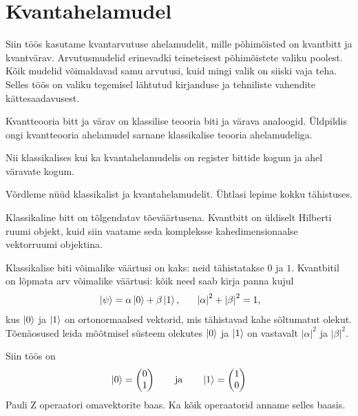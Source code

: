 \documentclass[12pt]{report}
\def\abs#1{\left|#1\right|}
\def\ket#1{\mathinner{|#1\rangle}}
\begin{document}
\section{Kvantahelamudel}

Siin töös kasutame kvantarvutuse ahelamudelit, mille põhimõisted on kvantbitt
ja kvantvärav. Arvutusmudelid erinevadki teineteisest põhimõistete valiku
poolest. Kõik mudelid võimaldavad samu arvutusi, kuid mingi valik on siiski
vaja teha. Selles töös on valiku tegemisel lähtutud kirjanduse ja tehniliste
vahendite kättesaadavusest.

Kvantteooria bitt ja värav on klassilise teooria biti ja värava analoogid.
Üldpildis ongi kvantteooria ahelamudel sarnane klassikalise teooria
ahelamudeliga.

Nii klassikalises kui ka kvantahelamudelis on register bittide kogum ja ahel
väravate kogum.

Võrdleme nüüd klassikalist ja kvantahelamudelit. Ühtlasi lepime kokku
tähistuses.

Klassikaline bitt on tõlgendatav tõeväärtusena. Kvantbitt on üldiselt Hilberti
ruumi objekt, kuid siin vaatame seda kompleksse kahedimensionaalse vektorruumi
objektina.

Klassikalise biti võimalike väärtusi on kaks: neid tähistatakse \(0\) ja \(1\).
Kvantbitil on lõpmata arv võimalike väärtusi: kõik need saab kirja panna kujul
\begin{align}
    \ket{\psi} = \alpha\ket{0} + \beta\ket{1} \rlap{,}
    \qquad \abs{\alpha}^2 + \abs{\beta}^2 = 1 \rlap{,}
\end{align}
kus \(\ket{0}\) ja \(\ket{1}\) on ortonormaalsed vektorid, mis tähistavad kahe
sõltumatut olekut. Tõenäosused leida mõõtmisel süsteem olekutes \(\ket{0}\) ja
\(\ket1\) on vastavalt \(\abs{\alpha}^2\) ja \(\abs{\beta}^2\).

Siin töös on
\begin{align}
    \ket{0} = \begin{pmatrix}
        0 \\
        1 \\
    \end{pmatrix}
    \qquad \text{ja} \qquad
    \ket{1} = \begin{pmatrix}
        1 \\
        0 \\
    \end{pmatrix}
\end{align}
Pauli Z operaatori omavektorite baas. Ka kõik operaatorid anname selles baasis.
\end{document}
